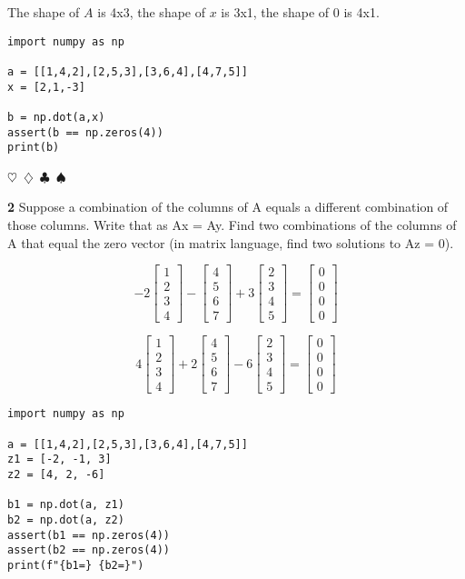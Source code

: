\documentclass{article}
\newcommand{\sep}{\begin{center}$\heartsuit$~$\diamondsuit$~$\clubsuit$~$\spadesuit$\end{center}}
\begin{document}
The shape of $A$ is 4x3, the shape of $x$ is 3x1, the shape of 0 is 4x1.

\begin{verbatim}
import numpy as np

a = [[1,4,2],[2,5,3],[3,6,4],[4,7,5]]
x = [2,1,-3]

b = np.dot(a,x)
assert(b == np.zeros(4))
print(b)
\end{verbatim}

\sep

\noindent\textbf{2} Suppose a combination of the columns of A equals a different combination of those 
columns. Write that as Ax = Ay. Find two combinations of the columns of A that
equal the zero vector (in matrix language, find two solutions to Az = 0).

\begin{displaymath}
-2 \begin{bmatrix} 1 \\ 2 \\ 3 \\ 4 \end{bmatrix}
- \begin{bmatrix} 4 \\ 5 \\ 6 \\ 7 \end{bmatrix}
+ 3 \begin{bmatrix} 2 \\ 3 \\ 4 \\ 5 \end{bmatrix}
= \begin{bmatrix} 0 \\ 0 \\ 0 \\ 0 \end{bmatrix}
\end{displaymath}

\begin{displaymath}
4 \begin{bmatrix} 1 \\ 2 \\ 3 \\ 4 \end{bmatrix}
+ 2 \begin{bmatrix} 4 \\ 5 \\ 6 \\ 7 \end{bmatrix}
- 6 \begin{bmatrix} 2 \\ 3 \\ 4 \\ 5 \end{bmatrix}
= \begin{bmatrix} 0 \\ 0 \\ 0 \\ 0 \end{bmatrix}
\end{displaymath}

\begin{verbatim}
import numpy as np

a = [[1,4,2],[2,5,3],[3,6,4],[4,7,5]]
z1 = [-2, -1, 3]
z2 = [4, 2, -6]

b1 = np.dot(a, z1)
b2 = np.dot(a, z2)
assert(b1 == np.zeros(4))
assert(b2 == np.zeros(4))
print(f"{b1=} {b2=}")
\end{verbatim}
\end{document}
